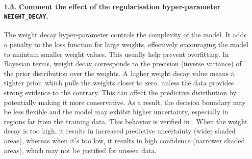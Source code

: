\paragraph{1.3. Comment the effect of the regularisation hyper-parameter \texttt{WEIGHT\_DECAY}.}

The weight decay hyper-parameter controls the complexity of the model. It adds a penalty to the loss function for large weights, effectively encouraging the model to maintain smaller weight values. This usually help prevent overfitting. In Bayesian terms, weight decay corresponds to the precision (inverse variance) of the prior distribution over the weights. A higher weight decay value means a tighter prior, which pulls the weights closer to zero, unless the data provides strong evidence to the contrary. This can affect the predictive distribution by potentially making it more conservative. As a result, the decision boundary may be less flexible and the model may exhibit higher uncertainty, especially in regions far from the training data. This behavior is verified in . When the weight decay is too high, it results in increased predictive uncertainty (wider shaded areas), whereas when it's too low, it results in high confidence (narrower shaded areas), which may not be justified for unseen data.

